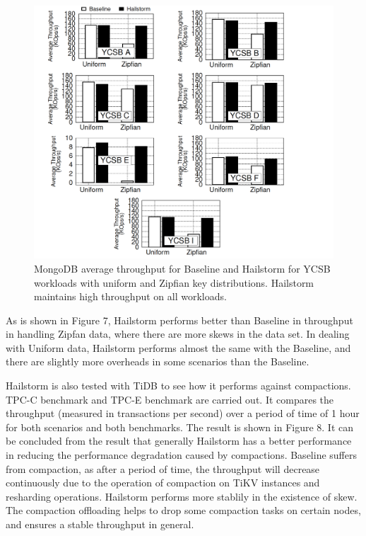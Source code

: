 \documentclass[a4paper,10pt,twoside]{article}
\begin{document}
\begin{figure}[h]
    \centering
	\includegraphics[scale=0.3]{YCSB_throughput.png}
    \caption{MongoDB average throughput for Baseline and Hailstorm
	for YCSB workloads with uniform and Zipfian key distributions.
	Hailstorm maintains high throughput on all workloads.}
    \label{fig:mesh1}
\end{figure}
As is shown in Figure 7, Hailstorm performs better than Baseline in throughput in handling Zipfan data, where there are more skews in the data set.
In dealing with Uniform data, Hailstorm performs almost the same with the Baseline, and there are slightly more overheads in some scenarios than the Baseline.
\par
Hailstorm is also tested with TiDB to see how it performs against compactions.
TPC-C\cite{10.1145/369275.369291} benchmark and TPC-E\cite{10.1145/1942776.1942778} benchmark are carried out.
It compares the throughput (measured in transactions per second) over a period of time of 1 hour for both scenarios and both benchmarks. 
The result is shown in Figure 8.
It can be concluded from the result that generally Hailstorm has a better performance in reducing the performance degradation caused by compactions.
Baseline suffers from compaction, as after a period of time, the throughput will decrease continuously due to the operation of compaction on TiKV instances and resharding operations.
Hailstorm performs more stablily in the existence of skew. 
The compaction offloading helps to drop some compaction tasks on certain nodes, and ensures a stable throughput in general.
\end{document}
